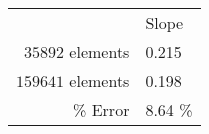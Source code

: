 \begin{tabular}{r | l}
 & Slope\\
\(35892\) elements & 0.215\\
\(159641\) elements & 0.198\\
\% Error & 8.64 \%
\end{tabular}
